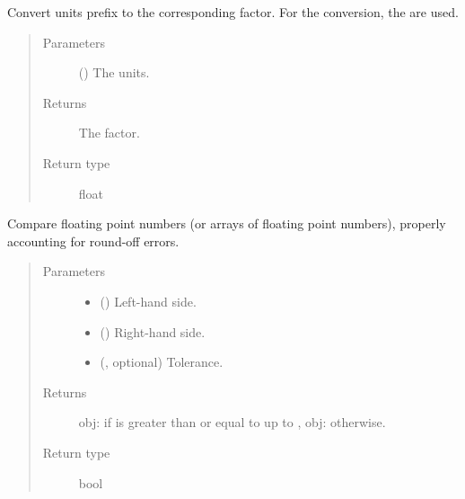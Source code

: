 \documentclass[letterpaper,10pt,english]{sphinxmanual}
\begin{document}

\begin{fulllineitems}
\label{\detokenize{api:utils.get_factor}}
Convert units prefix to the corresponding factor.
For the conversion, the  are used.
\begin{quote}\begin{description}
\item[{Parameters}] \leavevmode
{} () \textendash{} The units.

\item[{Returns}] \leavevmode
The factor.

\item[{Return type}] \leavevmode
float

\end{description}\end{quote}

\end{fulllineitems}


\begin{fulllineitems}
\label{\detokenize{api:utils.greater_or_equal_than}}
Compare floating point numbers (or arrays of floating point numbers),
properly accounting for round-off errors.
\begin{quote}\begin{description}
\item[{Parameters}] \leavevmode\begin{itemize}
\item {} 
 () \textendash{} Left-hand side.

\item {} 
 () \textendash{} Right-hand side.

\item {} 
 (, optional) \textendash{} Tolerance.

\end{itemize}

\item[{Returns}] \leavevmode
obj: if  is greater than or equal to  up to , obj: otherwise.

\item[{Return type}] \leavevmode
bool

\end{description}\end{quote}

\end{fulllineitems}
\end{document}
